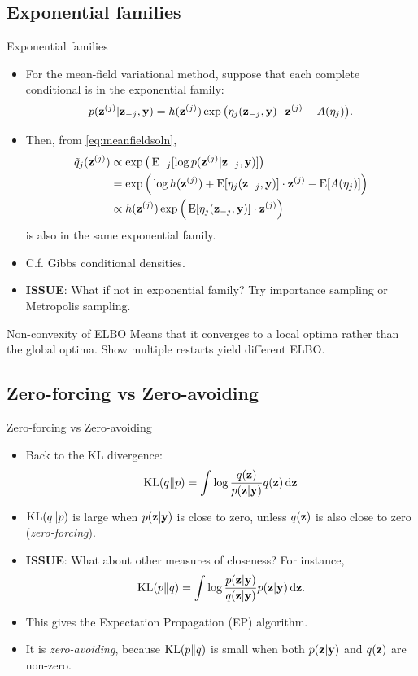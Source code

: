 \subsection{Exponential families}

\begin{frame}{Exponential families}
  \begin{itemize}
    \item For the mean-field variational method, suppose that each complete conditional is in the exponential family:
    \[
      p({\mathbf z}^{(j)}|{\mathbf z}_{-j},{\mathbf y}) = h({\mathbf z}^{(j)})\exp \big(\eta_j({\mathbf z}_{-j},{\mathbf y})\cdot {\mathbf z}^{(j)} - A(\eta_j) \big).
    \]
    \item Then, from \eqref{eq:meanfieldsoln}, 
    \begin{align*}
      \tilde q_j({\mathbf z}^{(j)}) &\propto \exp\big(\operatorname{E}_{-j}[\log p({\mathbf z}^{(j)}|{\mathbf z}_{-j},{\mathbf y})]\big) \\
      &= \exp \Big(\log h({\mathbf z}^{(j)}) + \operatorname{E} [\eta_j({\mathbf z}_{-j},{\mathbf y})] \cdot {\mathbf z}^{(j)} - \operatorname{E} [ A(\eta_j) ] \Big) \\
      &\propto h({\mathbf z}^{(j)})\exp \Big(\operatorname{E} [\eta_j({\mathbf z}_{-j},{\mathbf y})] \cdot {\mathbf z}^{(j)} \Big)
    \end{align*}
    is also in the same exponential family.
    \item C.f. Gibbs conditional densities.
    \item \textbf{ISSUE}: What if not in exponential family? Try importance sampling or Metropolis sampling.
  \end{itemize}
\end{frame}

\begin{frame}{Non-convexity of ELBO}
  Means that it converges to a local optima rather than the global optima. Show multiple restarts yield different ELBO.
\end{frame}

\subsection{Zero-forcing vs Zero-avoiding}

\begin{frame}{Zero-forcing vs Zero-avoiding}
  \begin{itemize}
    \item Back to the KL divergence:
    \[
      \operatorname{KL}(q \Vert p) = \int \log \frac{q({\mathbf z})}{p({\mathbf z}|{\mathbf y})} q({\mathbf z}) \, \text{d}{\mathbf z}
    \]
    \item $\operatorname{KL}(q \Vert p)$ is large when $p({\mathbf z}|{\mathbf y})$ is close to zero, unless $q({\mathbf z})$ is also close to zero (\emph{zero-forcing}).
    \item \textbf{ISSUE}: What about other measures of closeness? For instance,
    \[
      \operatorname{KL}(p \Vert q) = \int \log \frac{p({\mathbf z}|{\mathbf y})}{q({\mathbf z}|{\mathbf y})} p({\mathbf z}|{\mathbf y}) \, \text{d}{\mathbf z}.
    \]
    \item This gives the Expectation Propagation (EP) algorithm. 
    \item It is \emph{zero-avoiding}, because $\operatorname{KL}(p\Vert q)$ is small when both $p({\mathbf z}|{\mathbf y})$ and $q({\mathbf z})$ are non-zero.
  \end{itemize}
\end{frame}

